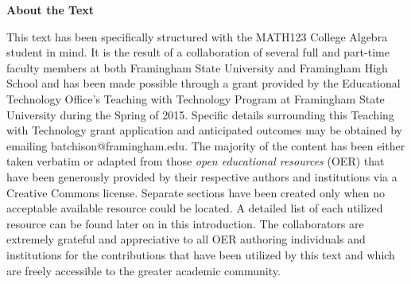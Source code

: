 \begin{center}\textbf{About the Text} \end{center}\par \indent This text has been specifically structured with the MATH123 College Algebra student in mind.  It is the result of a collaboration of several full and part-time faculty members at both Framingham State University and Framingham High School and has been made possible through a grant provided by the Educational Technology Office's Teaching with Technology Program at Framingham State University during the Spring of 2015.  Specific details surrounding this Teaching with Technology grant application and anticipated outcomes may be obtained by emailing {\small batchison@framingham.edu}.
\pp \indent The majority of the content has been either taken verbatim or adapted from those \textit{open educational resources} (OER) that have been generously provided by their respective authors and institutions via a Creative Commons license.  Separate sections have been created only when no acceptable available resource could be located.  A detailed list of each utilized resource can be found later on in this introduction.  The collaborators are extremely grateful and appreciative to all OER authoring individuals and institutions for the contributions that have been utilized by this text and which are freely accessible to the greater academic community.
\par
{}

